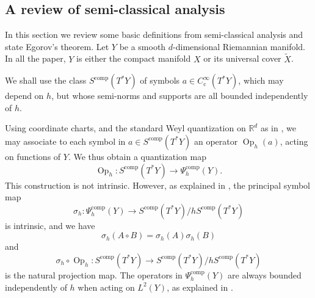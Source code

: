\documentclass[JEP,XML,SOM,Unicode,published]{cedram}
\newcommand{\rc}{\mathrm{c}}
\newcommand{\comp}{\mathrm{comp}}
\DeclareMathOperator{\Op}{Op}
\theoremstyle{plain}
\theoremstyle{definition}
\begin{document}
\begin{appendix}
\section{A review of semi-classical analysis}\label{sec:semi-classique}
In this section we review some basic definitions from semi-classical analysis and state Egorov's theorem. Let $Y$ be a smooth $d$-dimensional Riemannian manifold. In all the paper, $Y$ is either the compact manifold $X$ or its universal cover $\widetilde{X}$.

We shall use the class $S^{\comp}(T^*Y)$ of symbols $a\in C_\rc^\infty(T^*Y)$,
which may depend on $h$, but whose semi-norms and supports are all bounded
independently of $h$.

Using coordinate charts, and the standard Weyl quantization on $\mathbb{R}^d$ as in \cite[\S 14.2]{Zworski_2012}, we may associate to each symbol in $a\in S^{\comp}(T^*Y)$ an operator $\Op_h(a)$, acting on functions of $Y$. We thus obtain a quantization map
\begin{equation*}
\Op_h:S^{\comp}(T^*Y)\to \Psi^{\comp}_h(Y).
\end{equation*}
This construction is not intrinsic. However, as explained in \cite[Th.\,14.2]{Zworski_2012}, the principal
symbol map
\begin{equation*}
\sigma_h : \Psi^{\comp}_h (Y)\to S^{\comp}(T^*Y)/
h S^{\comp}(T^*Y)
\end{equation*} is intrinsic, and we have
\begin{equation*}\sigma_h(A\circ B) = \sigma_h (A) \sigma_h(B)
\end{equation*}
and\vspace*{-3pt}
\begin{equation*}
\sigma_h\circ \Op_h: S^{\comp}(T^* Y) \to S^{\comp} (T^*Y) /h
S^{\comp}(T^*Y)
\end{equation*}
is the natural projection map. The operators in $\Psi_h^{\comp}(Y)$ are always bounded independently of $h$ when acting on $L^2(Y)$, as explained in \cite[Th.\,14.2]{Zworski_2012}.


\end{appendix}
\end{document}
